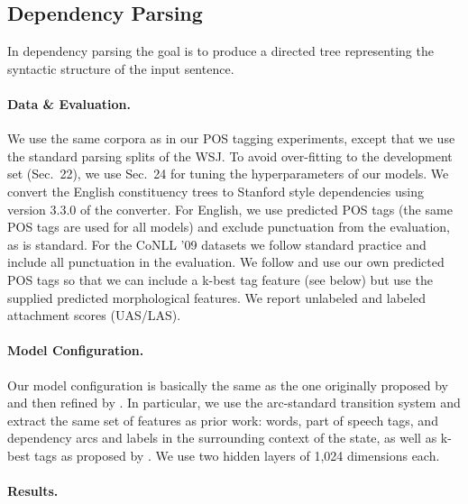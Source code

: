


\subsection{Dependency Parsing}

In dependency parsing the goal is to produce a directed tree representing
the syntactic structure of the input sentence.

\paragraph{Data \& Evaluation.}

We use the same corpora as in our POS tagging experiments, except that we use
the standard parsing splits of the WSJ. To avoid over-fitting to the development
set (Sec.~22), we use Sec.~24 for tuning the hyperparameters of our models.
We convert the English constituency trees to Stanford style dependencies
\cite{stanford_dependencies} using version 3.3.0 of the converter.
For English, we use predicted POS tags (the same POS tags are used for
all models) and exclude punctuation from the evaluation, as is standard.
For the CoNLL '09 datasets
we follow standard practice and include all punctuation in the evaluation.
We follow  and 
use our own predicted POS tags so that we can include a k-best tag
feature (see below) but use the supplied predicted morphological features.
We report unlabeled and labeled attachment scores (UAS/LAS).

\paragraph{Model Configuration.}

Our model configuration is basically the same as the one originally proposed
by  and then refined by
. 
In particular, we use the arc-standard
transition system and extract the same set of features
as prior work: words, part of speech tags, and
dependency arcs and labels in the surrounding context of the state, 
as well as k-best tags as proposed by .
We use two hidden layers of 1,024 dimensions each.

\paragraph{Results.}

